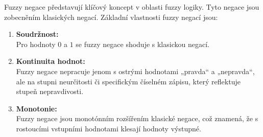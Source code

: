 Fuzzy negace představují klíčový koncept v oblasti fuzzy logiky. Tyto negace jsou zobecn\v en\'im klasick\'ych negac\'i. Základní vlastnosti fuzzy negací jsou:

\begin{enumerate}
\item \textbf{Soudržnost:}\\
Pro hodnoty $0$ a $1$ se fuzzy negace shoduje s klasickou negac\'i.
    \item \textbf{Kontinuita hodnot:} \\
        Fuzzy negace nepracuje jenom s  ostrými hodnotami „pravda“ a „nepravda“, ale na stupni neurčitosti či specifickým číselném zápisu, který reflektuje stupeň nepravdivosti.
    \item \textbf{Monotonie:} \\
        Fuzzy negace jsou monot\'onn\'im roz\v s\'i\v ren\'im klasick\'e negace, což znamená, že s rostoucími vstupn\'imi hodnotami klesaj\'i hodnoty výstupn\'e.
    
\end{enumerate}

